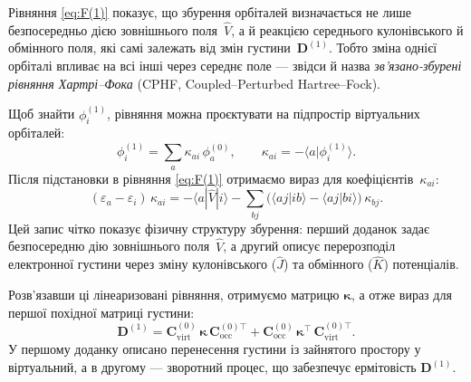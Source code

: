 Рівняння \eqref{eq:F(1)} показує, що збурення орбіталей визначається не лише безпосередньо дією зовнішнього поля~\(\hat V\),
а й реакцією середнього кулонівського й обмінного поля,
які самі залежать від змін густини~\(\mathbf D^{(1)}\).
Тобто зміна однієї орбіталі впливає на всі інші через середнє поле ---
звідси й назва \emph{зв’язано-збурені рівняння Хартрі–Фока} (CPHF, Coupled–Perturbed Hartree–Fock).



Щоб знайти $\phi_i^{(1)}$, рівняння можна проєктувати на підпростір віртуальних орбіталей:
\[
\phi_i^{(1)} = \sum_a \kappa_{ai}\,\phi_a^{(0)}, \qquad
\kappa_{ai} = -\langle a|\phi_i^{(1)}\rangle.
\]
Після підстановки в рівняння \eqref{eq:F(1)} отримаємо вираз для коефіцієнтів~$\kappa_{ai}$:
\[
(\varepsilon_a - \varepsilon_i)\,\kappa_{ai}
= - \langle a|\hat V|i\rangle
- \sum_{bj} \big(\langle aj|ib\rangle - \langle aj|bi\rangle\big)\,\kappa_{bj}.
\]
Цей запис чітко показує фізичну структуру збурення:
перший доданок задає безпосередню дію зовнішнього поля~$\hat V$,
а другий описує перерозподіл електронної густини через зміну кулонівського (\(\hat J\))
та обмінного (\(\hat K\)) потенціалів.

Розв’язавши ці лінеаризовані рівняння, отримуємо матрицю $\boldsymbol\kappa$, а отже вираз для першої похідної матриці густини:
\begin{equation}\label{eq:D(1)}
\mathbf D^{(1)} = \mathbf C_{\text{virt}}^{(0)}\,\boldsymbol\kappa\,\mathbf C_{\text{occ}}^{(0)\top}
+ \mathbf C_{\text{occ}}^{(0)}\,\boldsymbol\kappa^\top\,\mathbf C_{\text{virt}}^{(0)\top}.
\end{equation}
У першому доданку описано перенесення густини із зайнятого простору у віртуальний, а в другому — зворотний процес, що забезпечує ермітовість $\mathbf D^{(1)}$.



